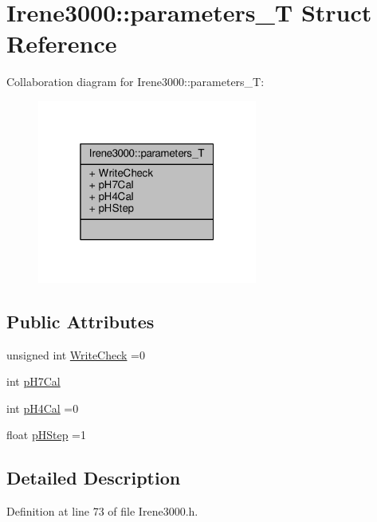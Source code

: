 \hypertarget{structIrene3000_1_1parameters__T}{}\section{Irene3000\+:\+:parameters\+\_\+T Struct Reference}
\label{structIrene3000_1_1parameters__T}


Collaboration diagram for Irene3000\+:\+:parameters\+\_\+T\+:\nopagebreak
\begin{figure}[H]
\begin{center}
\leavevmode
\includegraphics[width=205pt]{structIrene3000_1_1parameters__T__coll__graph}
\end{center}
\end{figure}
\subsection*{Public Attributes}
\begin{DoxyCompactItemize}
\item 
unsigned int \hyperlink{structIrene3000_1_1parameters__T_a56f1f14d33a69300d580eda2dc52cecd}{Write\+Check} =0
\item 
int \hyperlink{structIrene3000_1_1parameters__T_a21265466a570d84bff914f26d2f7a03e}{p\+H7\+Cal}
\item 
int \hyperlink{structIrene3000_1_1parameters__T_a1144de6fb54eb3e1dd2a3d8c2afc97dc}{p\+H4\+Cal} =0
\item 
float \hyperlink{structIrene3000_1_1parameters__T_a61cfcc2539d5f630e9071f3753aba9fe}{p\+H\+Step} =1
\end{DoxyCompactItemize}


\subsection{Detailed Description}


Definition at line 73 of file Irene3000.\+h.




